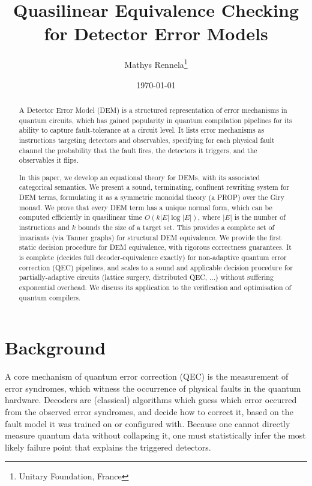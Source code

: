 \documentclass[11pt,a4paper]{article}
\title{Quasilinear Equivalence Checking\\
       for Detector Error Models}
\author{Mathys Rennela\thanks{Unitary Foundation, France}}
\date{\today}
\begin{document}

\maketitle

\begin{abstract}
A Detector Error Model (DEM) is a structured representation of error mechanisms in quantum circuits, which has gained popularity in quantum compilation pipelines for its ability to capture fault-tolerance at a circuit level. 
It lists error mechanisms as instructions targeting detectors and observables, specifying for each physical fault channel the probability that the fault fires, the detectors it triggers, and the observables it flips.

In this paper, we develop an equational theory for DEMs, with its associated categorical semantics. We present a sound, terminating, confluent rewriting system for DEM terms, formulating it as a symmetric monoidal theory (a PROP) over the Giry monad. 
We prove that every DEM term has a unique normal form, which can be computed efficiently in quasilinear time $O(k|E|\log|E|)$, where $|E|$ is the number of instructions and $k$ bounds the size of a target set. This provides a complete set of invariants (via Tanner graphs) for structural DEM equivalence.
We provide the first static decision procedure for DEM equivalence, with rigorous correctness guarantees. It is complete (decides full decoder-equivalence exactly) for non-adaptive quantum error correction (QEC) pipelines, and scales to a sound and applicable decision procedure for partially-adaptive circuits (lattice surgery, distributed QEC, ...) without suffering exponential overhead. We discuss its application to the verification and optimisation of quantum compilers.
\end{abstract}

\section{Background}
\label{sec:background}

A core mechanism of quantum error correction (QEC) is the measurement of error syndromes, which witness the occurrence of physical faults in the quantum hardware. Decoders are (classical) algorithms which guess which error occurred from the observed error syndromes, and decide how to correct it, based on the fault model it was trained on or configured with. Because one cannot directly measure quantum data without collapsing it, one must statistically infer the most likely failure point that explains the triggered detectors.
\end{document}
